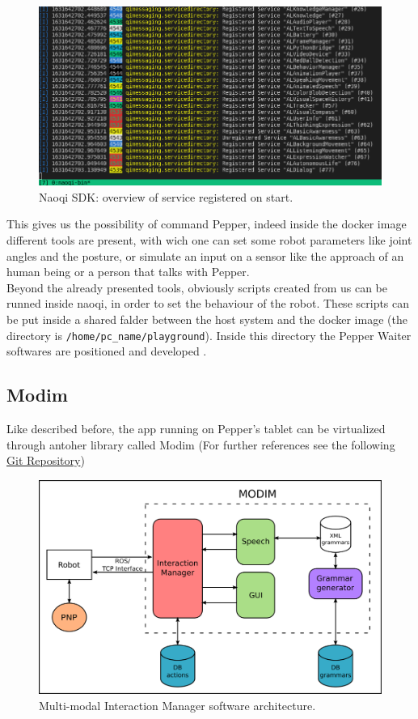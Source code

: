 \documentclass[12pt, letterpaper, twoside]{article}
\begin{document}
\begin{figure}[htbp]
	\centerline{\includegraphics[scale=.6]{img/naoqi.png}}
	\caption{Naoqi SDK: overview of service registered on start.}
	\label{fig}
\end{figure}

This gives us the possibility of command Pepper, indeed inside the docker image different tools are present, with wich one can set some robot parameters like joint angles and the posture, or simulate an input on a sensor like the approach of an human being or a person that talks with Pepper.\\

Beyond the already presented tools, obviously scripts created from us can be runned inside naoqi, in order to set the behaviour of the robot. These scripts can be put inside a shared falder between the host system and the docker image (the directory is \verb|/home/pc_name/playground|). Inside this directory the Pepper Waiter softwares are positioned and developed .

\subsection{Modim}
Like described before, the app running on Pepper's tablet can be virtualized through antoher library called Modim (For further references see the following \href{https://bitbucket.org/mtlazaro/modim.git}{Git Repository})\\

\begin{figure}[htbp]
	\centerline{\includegraphics[scale=.6]{img/modim.png}}
	\caption{ Multi-modal Interaction Manager software architecture.}
	\label{fig}
\end{figure}
\end{document}
